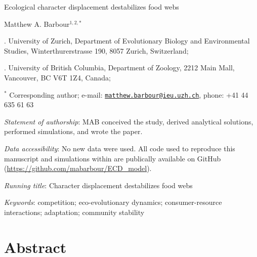 \documentclass[11pt,]{article}
\title{}
\author{}
\date{}
\begin{document}
\vspace*{0.1cm}

\begin{center} \LARGE Ecological character displacement destabilizes food webs \end{center}

\bigskip

\begin{center} \large Matthew A. Barbour$^{1,2,\ast}$ \normalsize \end{center}

\bigskip

. University of Zurich, Department of Evolutionary Biology
and Environmental Studies, Winterthurerstrasse 190, 8057 Zurich,
Switzerland;

. University of British Columbia, Department of Zoology, 2212
Main Mall, Vancouver, BC V6T 1Z4, Canada;

\(^\ast\) Corresponding author; e-mail:
\href{mailto:matthew.barbour@ieu.uzh.ch}{\nolinkurl{matthew.barbour@ieu.uzh.ch}},
phone: +41 44 635 61 63

\bigskip

\emph{Statement of authorship}: MAB conceived the study, derived
analytical solutions, performed simulations, and wrote the paper.

\bigskip

\emph{Data accessibility}: No new data were used. All code used to
reproduce this manuscript and simulations within are publically
available on GitHub (\url{https://github.com/mabarbour/ECD_model}).

\bigskip

\emph{Running title}: Character displacement destabilizes food webs

\bigskip

\emph{Keywords}: competition; eco-evolutionary dynamics;
consumer-resource interactions; adaptation; community stability

\linenumbers{} \modulolinenumbers[3]

\newpage

\section{Abstract}\label{abstract}
\end{document}
